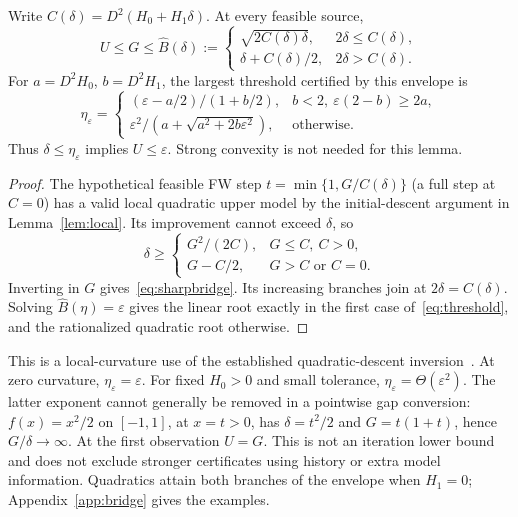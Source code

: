 \begin{lemma}\label{lem:bridge}
Write $C(\delta)=D^2(H_0+H_1\delta)$. At every feasible source,
\begin{equation}\label{eq:sharpbridge}
 U\le G\le\widehat B(\delta):=
 \begin{cases}
 \sqrt{2C(\delta)\delta},&2\delta\le C(\delta),\\
 \delta+C(\delta)/2,&2\delta>C(\delta).
 \end{cases}
\end{equation}
For $a=D^2H_0$, $b=D^2H_1$, the largest threshold certified by this
envelope is
\begin{equation}\label{eq:threshold}
 \eta_\varepsilon=
 \begin{cases}
 (\varepsilon-a/2)/(1+b/2),&b<2,\ \varepsilon(2-b)\ge2a,\\[2pt]
 \varepsilon^2/(a+\sqrt{a^2+2b\varepsilon^2}),&\text{otherwise}.
 \end{cases}
\end{equation}
Thus $\delta\le\eta_\varepsilon$ implies $U\le\varepsilon$.
Strong convexity is not needed for this lemma.
\end{lemma}
\begin{proof}
The hypothetical feasible FW step $t=\min\{1,G/C(\delta)\}$
(a full step at $C=0$) has a valid local quadratic upper model by
the initial-descent argument in Lemma~\ref{lem:local}.
Its improvement cannot exceed $\delta$, so
\[
 \delta\ge\begin{cases}G^2/(2C),&G\le C,\ C>0,\\
 G-C/2,&G>C\text{ or }C=0.
 \end{cases}
\]
Inverting in $G$ gives~\eqref{eq:sharpbridge}. Its increasing
branches join at $2\delta=C(\delta)$. Solving
$\widehat B(\eta)=\varepsilon$ gives the linear root exactly in the
first case of~\eqref{eq:threshold}, and the rationalized quadratic
root otherwise.
\end{proof}
This is a local-curvature use of the established quadratic-descent
inversion~\cite[Eq.~(15)]{lacoste2016}. At zero curvature,
$\eta_\varepsilon=\varepsilon$. For fixed $H_0>0$ and small tolerance,
$\eta_\varepsilon=\Theta(\varepsilon^2)$.
The latter exponent cannot generally be removed in a pointwise gap
conversion: $f(x)=x^2/2$ on $[-1,1]$, at $x=t>0$, has
$\delta=t^2/2$ and $G=t(1+t)$, hence $G/\delta\to\infty$.
At the first observation $U=G$. This is not an iteration lower bound
and does not exclude stronger certificates using history or extra
model information. Quadratics attain both branches of the envelope
when $H_1=0$; Appendix~\ref{app:bridge} gives the examples.

